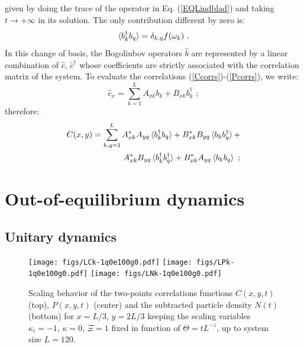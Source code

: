 \documentclass[pra,twocolumn,preprintnumbers,amsmath,amssymb,nofootinbib,floatfix,longbibliography]{revtex4}
\begin{document}
given by doing the trace of the operator in Eq.
(\ref{EQLindblad}) and taking $t\to +\infty$ in its
solution. The only contribution different by zero is:
\begin{equation}
  \label{BogCorrInit}
  \braket{b^\dagger_k b_q} = \delta_{k,q} f(\omega_k) \,\,.
\end{equation}
In this change of basis, the
Bogoliubov operators $\hat b$ are represented by a linear
combination of $\hat c,\,\hat c^\dagger$ whose coefficients
are strictly associated with the correlation matrix of the
system.
To evaluate the correlations (\ref{Ccorrs})-(\ref{Pcorrs}),
we write:
\begin{equation}
  \label{transBogol}
  \hat c_x = \sum_{k=1}^L A_{xk} b_k + B_{xk} b^\dagger_k
  \,\,;
\end{equation}
therefore:
\begin{align}
  \label{initcorr}
   C(x,y) = \sum_{k,q=1}^L
  A^*_{xk}A_{yq} \braket{b^\dagger_k b_q}
  + B^*_{xk} B_{yq} \braket{b_k b^\dagger_q} + \notag\\
  A^*_{xk} B_{yq} \braket{b^\dagger_k b^\dagger_q} +
  B^*_{xk} A_{yq} \braket{b_k b_q}
  \,\,;
\end{align}
\medskip


\section{Out-of-equilibrium dynamics}

\subsection{Unitary dynamics}

\begin{figure}[!htb]
  \texttt{[image: figs/LCk-1q0e100g0.pdf]}
  \texttt{[image: figs/LPk-1q0e100g0.pdf]}
  \texttt{[image: figs/LNk-1q0e100g0.pdf]}
  \caption{Scaling behavior of the two-points
    correlations functions $C(x,y,t)$ (top), $P(x,y,t)$
    (center) and the subtracted particle density $N(t)$
    (bottom) for $x=L/3$, $y=2L/3$  keeping the scaling
    variables $\kappa_i=-1$, $\kappa=0$, $\Xi = 1$ fixed in
    function of $\Theta = tL^{-z}$, up to system size
    $L=120$.}
  \label{qthk0q2e1}
\end{figure}
\end{document}
